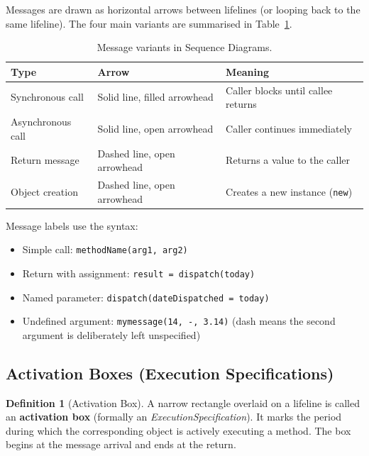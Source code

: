 \documentclass[11pt, a4paper, notitlepage]{report}
\theoremstyle{definition}
\newtheorem{definition}[theorem]{Definition}
\theoremstyle{remark}
\theoremstyle{definition}
\begin{document}
Messages are drawn as horizontal arrows between lifelines (or looping back to
the same lifeline). The four main variants are summarised in
Table~\ref{tab:ch7-messages}.

\begin{table}[h]
\centering
\begin{tabular}{@{}lll@{}}
\toprule
\textbf{Type} & \textbf{Arrow} & \textbf{Meaning} \\
\midrule
Synchronous call    & Solid line, filled arrowhead  & Caller blocks until callee returns \\
Asynchronous call   & Solid line, open arrowhead    & Caller continues immediately \\
Return message      & Dashed line, open arrowhead   & Returns a value to the caller \\
Object creation     & Dashed line, open arrowhead   & Creates a new instance (\texttt{new}) \\
\bottomrule
\end{tabular}
\caption{Message variants in Sequence Diagrams.}
\label{tab:ch7-messages}
\end{table}

Message labels use the syntax:
\begin{itemize}
  \item Simple call: \texttt{methodName(arg1, arg2)}
  \item Return with assignment: \texttt{result = dispatch(today)}
  \item Named parameter: \texttt{dispatch(dateDispatched = today)}
  \item Undefined argument: \texttt{mymessage(14, -, 3.14)} (dash means the
        second argument is deliberately left unspecified)
\end{itemize}

\subsection{Activation Boxes (Execution Specifications)}
\label{subsec:ch7-activation}

\begin{definition}[Activation Box]
\label{def:ch7-activation}
A narrow rectangle overlaid on a lifeline is called an \textbf{activation box}
(formally an \emph{ExecutionSpecification}). It marks the period during which
the corresponding object is actively executing a method. The box begins at the
message arrival and ends at the return.
\end{definition}
\end{document}
